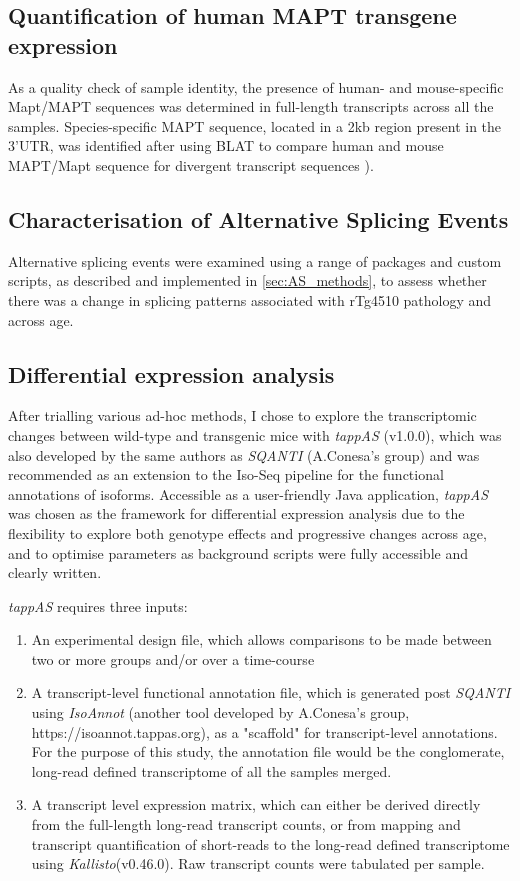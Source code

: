 \subsection{Quantification of human MAPT transgene expression} 
As a quality check of sample identity, the presence of human- and mouse-specific Mapt/MAPT sequences was determined in full-length transcripts across all the samples. Species-specific MAPT sequence, located in a 2kb region present in the 3'UTR, was identified after using BLAT\cite{Kent2002} to compare human and mouse MAPT/Mapt sequence for divergent transcript sequences \cite{Castanho2020}).  

\subsection{Characterisation of Alternative Splicing Events} 
Alternative splicing events were examined using a range of packages and custom scripts, as described and implemented in \cref{sec:AS_methods}, to assess whether there was a change in splicing patterns associated with rTg4510 pathology and across age. 


\subsection{Differential expression analysis}
After trialling various ad-hoc methods, I chose to explore the transcriptomic changes between wild-type and transgenic mice with \textit{tappAS} (v1.0.0)\cite{DeLaFuente2020}, which was also developed by the same authors as \textit{SQANTI} (A.Conesa's group) and was recommended as an extension to the Iso-Seq pipeline for the functional annotations of isoforms. Accessible as a user-friendly Java application, \textit{tappAS} was chosen as the framework for differential expression analysis due to the flexibility to explore both genotype effects and progressive changes across age, and to optimise parameters as background scripts were fully accessible and clearly written.

\textit{tappAS} requires three inputs\cite{DeLaFuente2020}:
\begin{enumerate}
	\item An experimental design file, which allows comparisons to be made between two or more groups and/or over a time-course 
	\item A transcript-level functional annotation file, which is generated post \textit{SQANTI} using \textit{IsoAnnot} (another tool developed by A.Conesa's group, https://isoannot.tappas.org), as a "scaffold" for transcript-level annotations. For the purpose of this study, the annotation file would be the conglomerate, long-read defined transcriptome of all the samples merged. 
	\item A transcript level expression matrix, which can either be derived directly from the full-length long-read transcript counts, or from mapping and transcript quantification of short-reads to the long-read defined transcriptome using \textit{Kallisto}(v0.46.0). Raw transcript counts were tabulated per sample.  	 
\end{enumerate}

